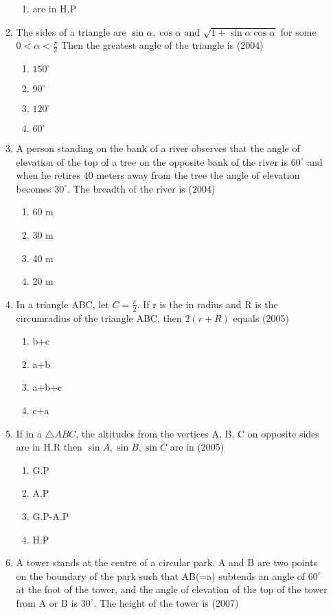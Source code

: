 \documentclass[12pt]{article}
\begin{document}
\begin{enumerate}
\begin{enumerate}
\begin{enumerate}
\item are in H.P
\end{enumerate}
\item The sides of a triangle are $\sin \alpha, \cos \alpha$ and $\sqrt{1+\sin\alpha\cos \alpha}$ for some $0<\alpha<\frac{\pi}{2}$ Then the greatest angle of the triangle is (2004)
\begin{enumerate}
\item $150^\circ$
\item $90^\circ$
\item $120^\circ$
\item $60^\circ$
\end{enumerate}
\item A person standing on the bank of a river observes that the angle of elevation of the top of a tree on the opposite bank of the river is $60^\circ$ and when he retires 40 meters away from the tree the angle of elevation becomes $30^\circ$. The breadth of the river is (2004)
\begin{enumerate}
\item 60 m
\item 30 m
\item 40 m
\item 20 m
\end{enumerate}
\item In a triangle ABC, let $C=\frac{\pi}{2}$. If r is the in radius and R is the circumradius of the triangle ABC, then $2(r+R)$ equals (2005) 
\begin{enumerate}
\item b+c
\item a+b
\item a+b+c
\item c+a
\end{enumerate}
\item If in a $\triangle ABC$, the altitudes from the vertices A, B, C on opposite sides are in H.R then $\sin A,\sin B,\sin C$ are in (2005)
\begin{enumerate}
\item G.P
\item A.P
\item G.P-A.P
\item H.P
\end{enumerate}
\item  A tower stands at the centre of a circular park. A and B are two points on the boundary of the park such that AB(=a) subtends an angle of $60^\circ$ at the foot of the tower, and the angle of elevation of the top of the tower from A or B is $30^\circ$. The height of the tower is (2007)

\end{enumerate}
\end{enumerate}
\end{document}
